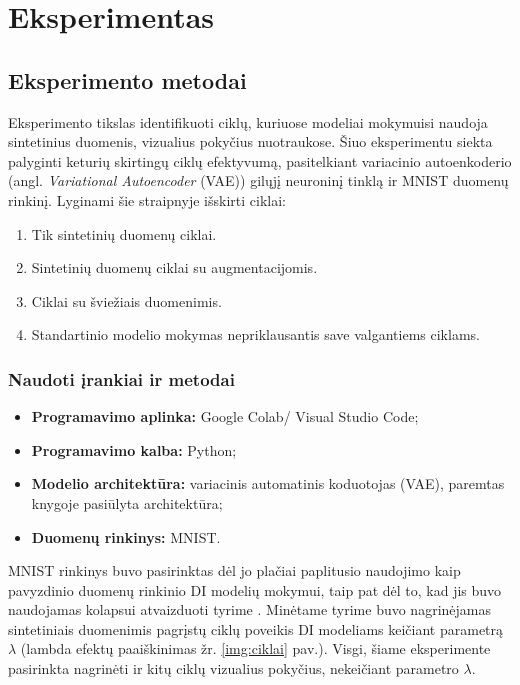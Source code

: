 \documentclass{VUMIFInfKursinis}
\begin{document}
\section{Eksperimentas}
\subsection{Eksperimento metodai}
Eksperimento tikslas identifikuoti ciklų, kuriuose modeliai mokymuisi naudoja sintetinius duomenis, vizualius pokyčius nuotraukose. Šiuo eksperimentu siekta palyginti keturių skirtingų ciklų efektyvumą, pasitelkiant variacinio autoenkoderio (angl. \textsl{Variational Autoencoder} (VAE)) gilųjį neuroninį tinklą ir MNIST \cite{MNIST} duomenų rinkinį. Lyginami šie straipnyje \cite{ModelsGoMAD} išskirti ciklai:
\begin{enumerate}
    \item Tik sintetinių duomenų ciklai.
    \item Sintetinių duomenų ciklai su augmentacijomis.
    \item Ciklai su šviežiais duomenimis.
    \item Standartinio modelio mokymas nepriklausantis save valgantiems ciklams.
\end{enumerate}

\subsubsection{Naudoti įrankiai ir metodai}

\begin{itemize}
    \item \textbf{Programavimo aplinka:} Google Colab/ Visual Studio Code;
    \item \textbf{Programavimo kalba:} Python;
    \item \textbf{Modelio architektūra:} variacinis automatinis koduotojas (VAE), paremtas \cite{DeepLearningPython} knygoje pasiūlyta architektūra;
    \item \textbf{Duomenų rinkinys:} MNIST.
\end{itemize}


MNIST rinkinys buvo pasirinktas dėl jo plačiai paplitusio naudojimo kaip pavyzdinio duomenų rinkinio DI modelių mokymui, taip pat dėl to, kad jis buvo naudojamas kolapsui atvaizduoti tyrime \cite{ModelsGoMAD}. Minėtame tyrime buvo nagrinėjamas sintetiniais duomenimis pagrįstų ciklų poveikis DI modeliams keičiant parametrą \(\lambda\) (lambda efektų paaiškinimas žr. \ref{img:ciklai} pav.). Visgi, šiame eksperimente pasirinkta nagrinėti ir kitų ciklų vizualius pokyčius, nekeičiant parametro \(\lambda\). 
\end{document}
